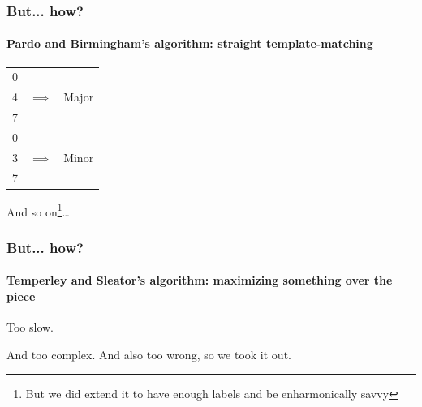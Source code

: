 \documentclass{beamer}
\begin{document}
\begin{frame}
  \frametitle{But... how?}
  \framesubtitle{Pardo and Birmingham's algorithm: straight
    template-matching}
  \begin{center}
    \begin{tabular}{rrr}
      0 &            &  \\
      4 & $\implies$ & Major \\
      7 &            &  \\ 
      \hline
      0 &            &  \\
      3 & $\implies$ & Minor \\
      7 &            &  \\
    \end{tabular}
  
    And so on\footnote{But we did extend it to have enough labels and
      be enharmonically savvy}\ldots
  \end{center}
\end{frame}

\begin{frame}
  \frametitle{But... how?}
  \framesubtitle{Temperley and Sleator's algorithm:
    maximizing something over the piece}
  \begin{center}
    \begin{huge}
      Too slow.
    \end{huge}
    
    \addvspace{5em}
    And too complex. And also too wrong, so we took it out.

  \end{center}
\end{frame}
\end{document}
